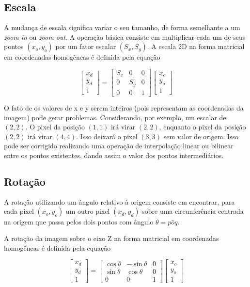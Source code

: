 \documentclass[12pt,oneside,a4paper,english,french,spanish,brazil,]{abntex2}
\begin{document}
\subsection{Escala}

A mudança de escala significa variar o seu tamanho, de forma semelhante a um \textit{zoom in} ou \textit{zoom out}. A operação básica consiste em multiplicar cada um de seus pontos \((x_o,y_o)\) por um fator escalar \((S_x,S_y)\). A escala 2D na forma matricial em coordenadas homogêneas é definida pela equação

\[
\begin{bmatrix}
x_d\\ 
y_d\\ 
1
\end{bmatrix}
=
\begin{bmatrix}
S_x & 0 & 0\\ 
0 & S_y & 0\\ 
0 & 0 & 1
\end{bmatrix}
\begin{bmatrix}
x_o\\ 
y_o\\ 
1
\end{bmatrix}
\]

O fato de os valores de x e y serem inteiros (pois representam as coordenadas da imagem) pode gerar problemas. Considerando, por exemplo, um escalar de \((2,2)\). O pixel da posição \((1,1)\) irá virar \((2,2)\), enquanto o pixel da posição \((2,2)\) irá virar \((4,4)\). Isso deixará o pixel \((3,3)\) sem valor de origem. Isso pode ser corrigido realizando uma operação de interpolação linear ou bilinear entre os pontos existentes, dando assim o valor dos pontos intermediários.

\subsection{Rotação}

A rotação utilizando um ângulo  relativo à origem consiste em encontrar, para cada pixel \((x_o,y_o)\) um outro pixel \((x_d,y_d)\) sobre uma circunferência centrada na origem que passa pelos dois pontos com ângulo \(\theta=p \hat{o} q\). 

A rotação da imagem sobre o eixo Z na forma matricial em coordenadas homogêneas é definida pela equação

\[
\begin{bmatrix}
x_d\\ 
y_d\\ 
1
\end{bmatrix}
=
\begin{bmatrix}
\cos{\theta} & -\sin{\theta} & 0\\ 
\sin{\theta} & \cos{\theta} & 0\\ 
0 & 0 & 1
\end{bmatrix}
\begin{bmatrix}
x_o\\ 
y_o\\ 
1
\end{bmatrix}
\]
\end{document}
